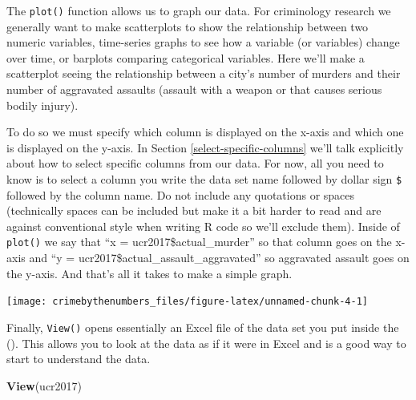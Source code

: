 \documentclass[
  12pt,
]{book}
\newenvironment{Shaded}{\begin{snugshade}}{\end{snugshade}}
\newcommand{\DataTypeTok}[1]{\textcolor[rgb]{0.27,0.27,0.27}{#1}}
\newcommand{\KeywordTok}[1]{\textcolor[rgb]{0.27,0.27,0.27}{\textbf{#1}}}
\newcommand{\NormalTok}[1]{#1}
\newcommand{\OperatorTok}[1]{\textcolor[rgb]{0.43,0.43,0.43}{\textbf{#1}}}
\begin{document}
The \texttt{plot()} function allows us to graph our data. For criminology research we generally want to make scatterplots to show the relationship between two numeric variables, time-series graphs to see how a variable (or variables) change over time, or barplots comparing categorical variables. Here we'll make a scatterplot seeing the relationship between a city's number of murders and their number of aggravated assaults (assault with a weapon or that causes serious bodily injury).

To do so we must specify which column is displayed on the x-axis and which one is displayed on the y-axis. In Section \ref{select-specific-columns} we'll talk explicitly about how to select specific columns from our data. For now, all you need to know is to select a column you write the data set name followed by dollar sign \texttt{\$} followed by the column name. Do not include any quotations or spaces (technically spaces can be included but make it a bit harder to read and are against conventional style when writing R code so we'll exclude them). Inside of \texttt{plot()} we say that ``x = ucr2017\$actual\_murder'' so that column goes on the x-axis and ``y = ucr2017\$actual\_assault\_aggravated'' so aggravated assault goes on the y-axis. And that's all it takes to make a simple graph.

\begin{Shaded}
\end{Shaded}

\begin{center}\texttt{[image: crimebythenumbers\_files/figure-latex/unnamed-chunk-4-1]} \end{center}

Finally, \texttt{View()} opens essentially an Excel file of the data set you put inside the (). This allows you to look at the data as if it were in Excel and is a good way to start to understand the data.

\begin{Shaded}
\begin{Highlighting}[]
\KeywordTok{View}\NormalTok{(ucr2017)}
\end{Highlighting}
\end{Shaded}
\end{document}
